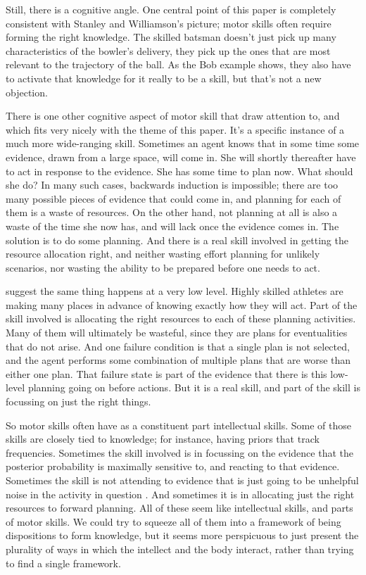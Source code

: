 Still, there is a cognitive angle. One central point of this paper is completely consistent with Stanley and Williamson's picture; motor skills often require forming the right knowledge. The skilled batsman doesn't just pick up many characteristics of the bowler's delivery, they pick up the ones that are most relevant to the trajectory of the ball. As the Bob example shows, they also have to activate that knowledge for it really to be a skill, but that's not a new objection.

There is one other cognitive aspect of motor skill that \citet{Yarrow2009} draw attention to, and which fits very nicely with the theme of this paper. It's a specific instance of a much more wide-ranging skill. Sometimes an agent knows that in some time some evidence, drawn from a large space, will come in. She will shortly thereafter have to act in response to the evidence. She has some time to plan now. What should she do? In many such cases, backwards induction is impossible; there are too many possible pieces of evidence that could come in, and planning for each of them is a waste of resources. On the other hand, not planning at all is also a waste of the time she now has, and will lack once the evidence comes in. The solution is to do some planning. And there is a real skill involved in getting the resource allocation right, and neither wasting effort planning for unlikely scenarios, nor wasting the ability to be prepared before one needs to act.

\citet[590-1]{Yarrow2009} suggest the same thing happens at a very low level. Highly skilled athletes are making many places in advance of knowing exactly how they will act. Part of the skill involved is allocating the right resources to each of these planning activities. Many of them will ultimately be wasteful, since they are plans for eventualities that do not arise. And one failure condition is that a single plan is not selected, and the agent performs some combination of multiple plans that are worse than either one plan. That failure state is part of the evidence that there is this low-level planning going on before actions. But it is a real skill, and part of the skill is focussing on just the right things.

So motor skills often have as a constituent part intellectual skills. Some of those skills are closely tied to knowledge; for instance, having priors that track frequencies. Sometimes the skill involved is in focussing on the evidence that the posterior probability is maximally sensitive to, and reacting to that evidence. Sometimes the skill is not attending to evidence that is just going to be unhelpful noise in the activity in question \cite[589]{Yarrow2009}. And sometimes it is in allocating just the right resources to forward planning. All of these seem like intellectual skills, and parts of motor skills. We could try to squeeze all of them into a framework of being dispositions to form knowledge, but it seems more perspicuous to just present the plurality of ways in which the intellect and the body interact, rather than trying to find a single framework.

